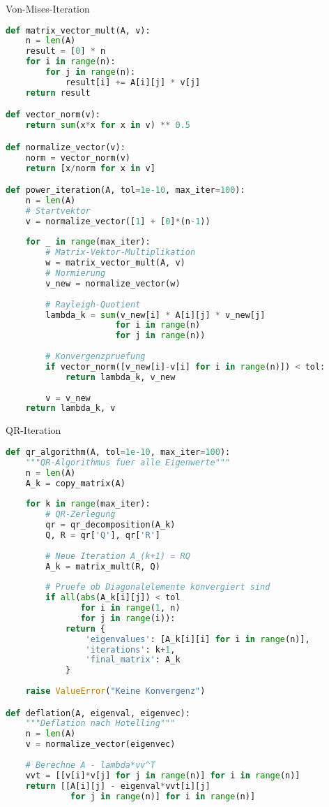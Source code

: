\begin{examplecode}{Von-Mises-Iteration}
\begin{lstlisting}[language=Python, style=basesmol]
def matrix_vector_mult(A, v):
    n = len(A)
    result = [0] * n
    for i in range(n):
        for j in range(n):
            result[i] += A[i][j] * v[j]
    return result

def vector_norm(v):
    return sum(x*x for x in v) ** 0.5

def normalize_vector(v):
    norm = vector_norm(v)
    return [x/norm for x in v]

def power_iteration(A, tol=1e-10, max_iter=100):
    n = len(A)
    # Startvektor
    v = normalize_vector([1] + [0]*(n-1))
    
    for _ in range(max_iter):
        # Matrix-Vektor-Multiplikation
        w = matrix_vector_mult(A, v)
        # Normierung
        v_new = normalize_vector(w)
        
        # Rayleigh-Quotient
        lambda_k = sum(v_new[i] * A[i][j] * v_new[j] 
                      for i in range(n) 
                      for j in range(n))
        
        # Konvergenzpruefung
        if vector_norm([v_new[i]-v[i] for i in range(n)]) < tol:
            return lambda_k, v_new
            
        v = v_new
    return lambda_k, v
\end{lstlisting}
\end{examplecode}

\begin{examplecode}{QR-Iteration}
\begin{lstlisting}[language=Python, style=basesmol]
def qr_algorithm(A, tol=1e-10, max_iter=100):
    """QR-Algorithmus fuer alle Eigenwerte"""
    n = len(A)
    A_k = copy_matrix(A)
    
    for k in range(max_iter):
        # QR-Zerlegung
        qr = qr_decomposition(A_k)
        Q, R = qr['Q'], qr['R']
        
        # Neue Iteration A_(k+1) = RQ
        A_k = matrix_mult(R, Q)
        
        # Pruefe ob Diagonalelemente konvergiert sind
        if all(abs(A_k[i][j]) < tol 
               for i in range(1, n) 
               for j in range(i)):
            return {
                'eigenvalues': [A_k[i][i] for i in range(n)],
                'iterations': k+1,
                'final_matrix': A_k
            }
    
    raise ValueError("Keine Konvergenz")

def deflation(A, eigenval, eigenvec):
    """Deflation nach Hotelling"""
    n = len(A)
    v = normalize_vector(eigenvec)
    
    # Berechne A - lambda*vv^T
    vvt = [[v[i]*v[j] for j in range(n)] for i in range(n)]
    return [[A[i][j] - eigenval*vvt[i][j] 
             for j in range(n)] for i in range(n)]
\end{lstlisting}
\end{examplecode}

